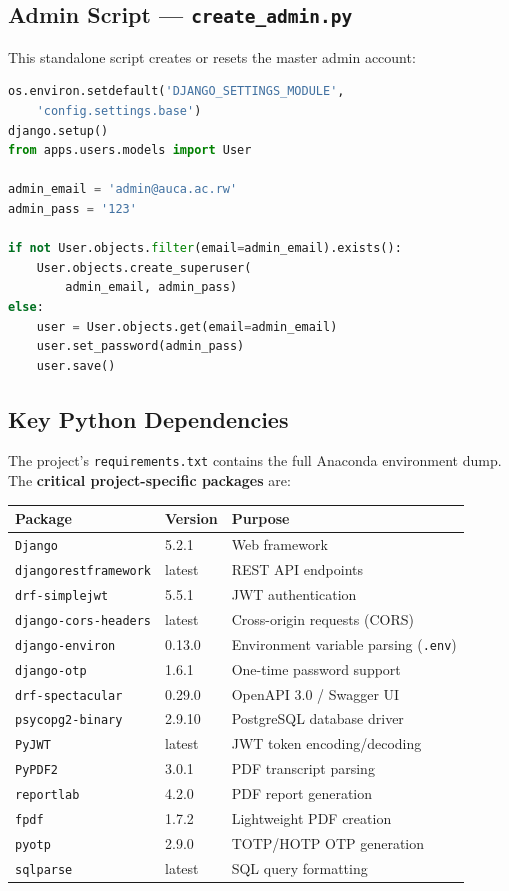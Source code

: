 \documentclass[12pt, a4paper]{article}
\begin{document}
\subsection{Admin Script --- \texttt{create\_admin.py}}

This standalone script creates or resets the master admin account:

\begin{lstlisting}[language=Python, caption={create\_admin.py --- Admin Account Setup}]
os.environ.setdefault('DJANGO_SETTINGS_MODULE',
    'config.settings.base')
django.setup()
from apps.users.models import User

admin_email = 'admin@auca.ac.rw'
admin_pass = '123'

if not User.objects.filter(email=admin_email).exists():
    User.objects.create_superuser(
        admin_email, admin_pass)
else:
    user = User.objects.get(email=admin_email)
    user.set_password(admin_pass)
    user.save()
\end{lstlisting}

\subsection{Key Python Dependencies}

The project's \texttt{requirements.txt} contains the full Anaconda environment dump. The \textbf{critical project-specific packages} are:

\begin{longtable}{p{5cm}p{2cm}p{7cm}}
\toprule
\textbf{Package} & \textbf{Version} & \textbf{Purpose} \\
\midrule
\endhead
\texttt{Django} & 5.2.1 & Web framework \\
\texttt{djangorestframework} & latest & REST API endpoints \\
\texttt{drf-simplejwt} & 5.5.1 & JWT authentication \\
\texttt{django-cors-headers} & latest & Cross-origin requests (CORS) \\
\texttt{django-environ} & 0.13.0 & Environment variable parsing (\texttt{.env}) \\
\texttt{django-otp} & 1.6.1 & One-time password support \\
\texttt{drf-spectacular} & 0.29.0 & OpenAPI 3.0 / Swagger UI \\
\texttt{psycopg2-binary} & 2.9.10 & PostgreSQL database driver \\
\texttt{PyJWT} & latest & JWT token encoding/decoding \\
\texttt{PyPDF2} & 3.0.1 & PDF transcript parsing \\
\texttt{reportlab} & 4.2.0 & PDF report generation \\
\texttt{fpdf} & 1.7.2 & Lightweight PDF creation \\
\texttt{pyotp} & 2.9.0 & TOTP/HOTP OTP generation \\
\texttt{sqlparse} & latest & SQL query formatting \\
\bottomrule
\end{longtable}
\end{document}
